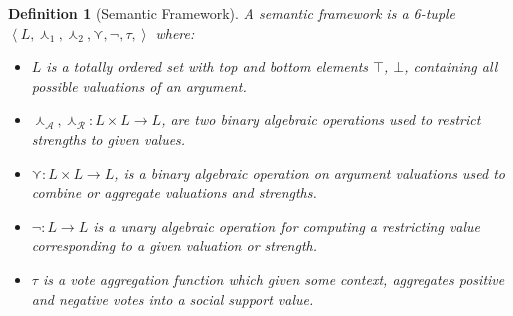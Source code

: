 \documentclass{article}
\newtheorem{definition}{Definition}
\newcommand{\args}{\mathcal{A}} %
\newcommand{\att}{\mathcal{R}}  %
\newcommand{\valueset}{L}
\newcommand{\sembodyNew}{\left\langle \valueset,\SAFand_1, \SAFand_2,\SAFor,\lnot,\tau, \right\rangle} %
\newcommand{\SAFand}{\curlywedge}     %
\newcommand{\SAFor}{\curlyvee}        %
\begin{document}
\begin{definition}[Semantic Framework]
\label{def:semfram}
A semantic framework is a 6-tuple \\$\sembodyNew$ where:

\begin{itemize}
  \item $\valueset$ is a totally ordered set with top and bottom elements $\top$, 
$\bot$, containing all possible valuations of an argument. 

  \item $\SAFand_\args,\SAFand_\att:\valueset\times \valueset\rightarrow \valueset$, are two binary algebraic operations used to restrict strengths to given values.
  
  \item $\SAFor:\valueset\times \valueset\rightarrow \valueset$, is a binary algebraic operation on argument valuations used to combine or aggregate valuations and strengths.
  
  \item $\lnot:\valueset\rightarrow \valueset$ is a unary algebraic operation for computing a restricting value corresponding to a given valuation or strength.
  
  \item $\tau$ is a vote aggregation function which given some context, aggregates positive and negative votes into a social support value.

\end{itemize}
\end{definition}
\end{document}
